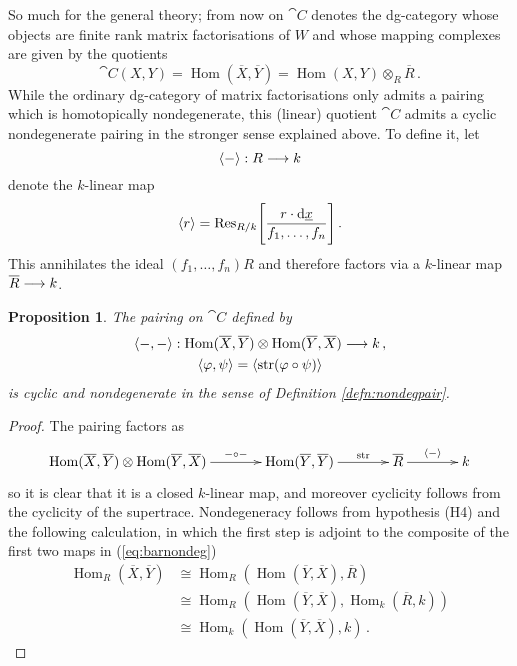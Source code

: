 \documentclass{compositio}
\newtheorem{proposition}[theorem]{Proposition}
\theoremstyle{definition}
\numberwithin{equation}{section}
\newcommand{\Ress}[1]{\res_{#1}\!}
\def\res{\operatorname{Res}}
\def\Hom{\operatorname{Hom}}
\DeclareMathOperator{\str}{str}
\begin{document}
So much for the general theory; from now on $\cat{C}$ denotes the dg-category whose objects are finite rank matrix factorisations of $W$ and whose mapping complexes are given by the quotients
\[
\cat{C}(X,Y) = \Hom(\overline{X}, \overline{Y}) = \Hom(X,Y) \otimes_R \overline{R}\,.
\]
While the ordinary dg-category of matrix factorisations only admits a pairing which is homotopically nondegenerate, this (linear) quotient $\cat{C}$ admits a cyclic nondegenerate pairing in the stronger sense explained above. To define it, let
\[
\langle - \rangle: R \longrightarrow k
\]
denote the $k$-linear map
\[
\langle r \rangle = \Ress{R/k}\Bigg[ \frac{r \cdot \ud \underline{x}}{ f_1, \ldots, f_n} \Bigg]\,.
\]
This annihilates the ideal $(f_1,\ldots,f_n)R$ and therefore factors via a $k$-linear map $\overline{R} \longrightarrow k$.

\begin{proposition}\label{prop:barnondeg} The pairing on $\cat{C}$ defined by
\begin{gather*}
\langle -, - \rangle: \Hom(\overline{X}, \overline{Y}) \otimes \Hom(\overline{Y}, \overline{X}) \lto k\,,\\
\langle \varphi, \psi \rangle = \langle \str( \varphi \circ \psi ) \rangle
\end{gather*}
is cyclic and nondegenerate in the sense of Definition \ref{defn:nondegpair}.
\end{proposition}
\begin{proof}
The pairing factors as
\begin{equation}\label{eq:barnondeg}
\xymatrix@C+1pc{
\Hom(\overline{X}, \overline{Y}) \otimes \Hom(\overline{Y}, \overline{X}) \ar[r]^-{-\circ-} & \Hom(\overline{Y}, \overline{Y}) \ar[r]^-{\str} & \overline{R} \ar[r]^-{\langle - \rangle} & k
}
\end{equation}
so it is clear that it is a closed $k$-linear map, and moreover cyclicity follows from the cyclicity of the supertrace. Nondegeneracy follows from hypothesis (H4) and the following calculation, in which the first step is adjoint to the composite of the first two maps in (\ref{eq:barnondeg})
\begin{align*}
\Hom_R(\overline{X}, \overline{Y}) &\cong \Hom_R( \Hom(\overline{Y}, \overline{X}), \overline{R} )\,\\
&\cong \Hom_R( \Hom(\overline{Y}, \overline{X}), \Hom_k( \overline{R}, k) )\\
&\cong \Hom_k( \Hom(\overline{Y}, \overline{X}), k )\,.
\end{align*}
\end{proof}
\end{document}
